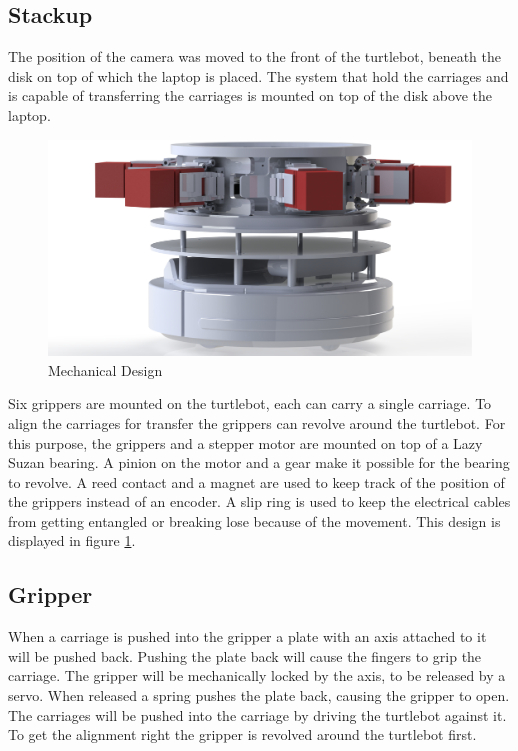 \documentclass[10pt, journal]{IEEEtran}
\begin{document}
\subsection{Stackup}
The position of the camera was moved to the front of the turtlebot, beneath the disk on top of which the laptop is placed. The system that hold the carriages and is capable of transferring the carriages is mounted on top of the disk above the laptop.
\begin{figure}[htp]
\centering
\includegraphics[width=\columnwidth]{turtle_design}
\caption{Mechanical Design}
\label{MechanicalDesign}
\end{figure}

Six grippers are mounted on the turtlebot, each can carry a single carriage. To align the carriages for transfer the grippers can revolve around the turtlebot. For this purpose, the grippers and a stepper motor are mounted on top of a Lazy Suzan bearing. A pinion on the motor and a gear make it possible for the bearing to revolve. A reed contact and a magnet are used to keep track of the position of the grippers instead of an encoder. A slip ring is used to keep the electrical cables from getting entangled or breaking lose because of the movement. This design is displayed in figure \ref{MechanicalDesign}.

\subsection{Gripper}
When a carriage is pushed into the gripper a plate with an axis attached to it will be pushed back. Pushing the plate back will cause the fingers to grip the carriage. The gripper will be mechanically locked by the axis, to be released by a servo. When released a spring pushes the plate back, causing the gripper to open. The carriages will be pushed into the carriage by driving the turtlebot against it. To get the alignment right the gripper is revolved around the turtlebot first.
\end{document}
